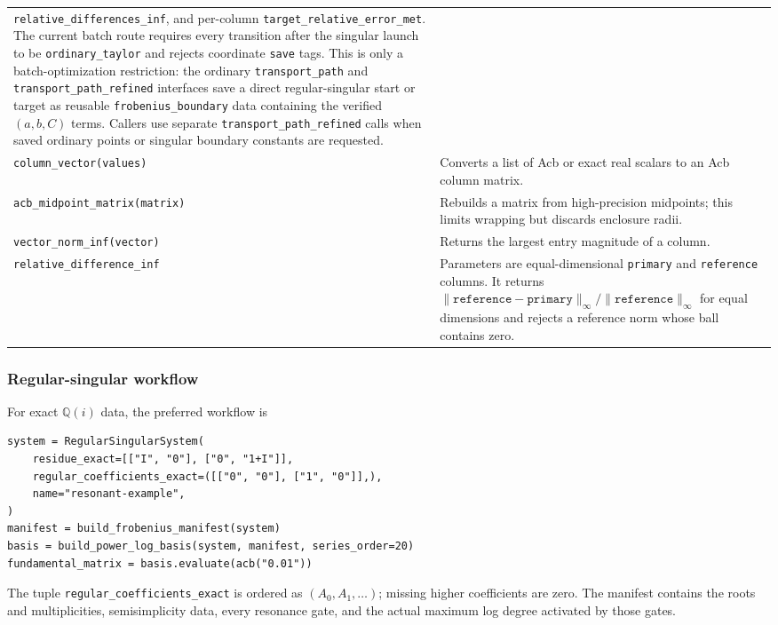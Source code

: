 \documentclass[11pt]{article}
\begin{document}
\begin{longtable}{L{0.36\textwidth}L{0.58\textwidth}}
\texttt{relative\_differences\_inf}, and per-column
\texttt{target\_relative\_error\_met}.  The current batch route requires every transition
after the singular launch to be \texttt{ordinary\_taylor} and rejects coordinate
\texttt{save} tags.  This is only a batch-optimization restriction: the ordinary
\texttt{transport\_path} and \texttt{transport\_path\_refined} interfaces save a direct
regular-singular start or target as reusable \texttt{frobenius\_boundary} data containing
the verified $(a,b,C)$ terms.  Callers use separate \texttt{transport\_path\_refined}
calls when saved ordinary points or singular boundary constants are requested. \\
\texttt{column\_vector(values)} & Converts a list of Acb or exact real scalars to an Acb
column matrix. \\
\texttt{acb\_midpoint\_matrix(matrix)} & Rebuilds a matrix from high-precision midpoints;
this limits wrapping but discards enclosure radii. \\
\texttt{vector\_norm\_inf(vector)} & Returns the largest entry magnitude of a column. \\
\texttt{relative\_difference\_inf} & Parameters are equal-dimensional \texttt{primary} and
\texttt{reference} columns.  It returns
$\|\texttt{reference}-\texttt{primary}\|_\infty/\|\texttt{reference}\|_\infty$ for equal
dimensions and rejects a reference norm whose ball contains zero. \\
\bottomrule
\end{longtable}
\normalsize

\subsubsection{Regular-singular workflow}

For exact $\mathbb Q(i)$ data, the preferred workflow is
\begin{verbatim}
system = RegularSingularSystem(
    residue_exact=[["I", "0"], ["0", "1+I"]],
    regular_coefficients_exact=([["0", "0"], ["1", "0"]],),
    name="resonant-example",
)
manifest = build_frobenius_manifest(system)
basis = build_power_log_basis(system, manifest, series_order=20)
fundamental_matrix = basis.evaluate(acb("0.01"))
\end{verbatim}
The tuple \texttt{regular\_coefficients\_exact} is ordered as
$(A_0,A_1,\ldots)$; missing higher coefficients are zero.  The manifest contains the roots
and multiplicities, semisimplicity data, every resonance gate, and the actual maximum log
degree activated by those gates.
\end{document}
